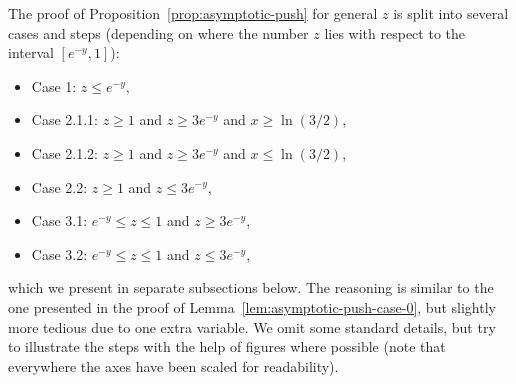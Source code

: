 \documentclass[a4paper]{amsart} %
\theoremstyle{definition}
\theoremstyle{remark}
\numberwithin{equation}{section}
\begin{document}
The proof of Proposition~\ref{prop:asymptotic-push} for general $z$ is split into several 
cases and steps
(depending on where the number $z$ lies with respect to the interval $[e^{-y}, 1]$):
\begin{itemize}
	\item Case 1: $z \leq e^{-y}$,
	\item Case 2.1.1: $z \geq 1$ and $z \geq 3e^{-y}$ and $x\geq \ln(3/2)$,
	\item Case 2.1.2: $z \geq 1$ and $z \geq 3e^{-y}$ and $x\leq \ln(3/2)$,
	\item Case 2.2: $z \geq 1$ and $z \leq 3e^{-y}$,
	\item Case 3.1: $e^{-y} \leq z \leq 1$ and $z \geq 3e^{-y}$,
	\item Case 3.2: $e^{-y} \leq z \leq 1$ and $z \leq 3e^{-y}$,
\end{itemize}
which we present in separate subsections below. 
The reasoning is similar to the one presented in the proof of Lemma~\ref{lem:asymptotic-push-case-0}, but slightly more tedious due to one extra variable.
We omit some standard details, but try to illustrate the steps with the help of figures where possible
(note that everywhere the axes have been scaled for readability).
\end{document}
